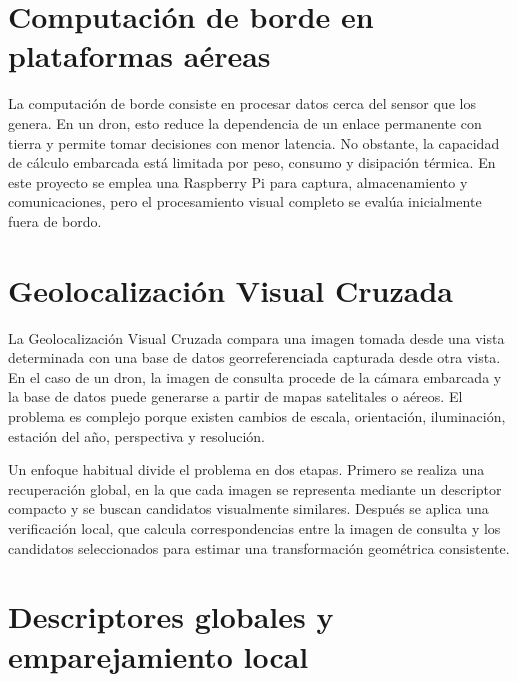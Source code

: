 \section{Computación de borde en plataformas aéreas}
\label{sec:estado-edge}

La computación de borde consiste en procesar datos cerca del sensor que los genera. En un dron, esto reduce la dependencia de un enlace permanente con tierra y permite tomar decisiones con menor latencia. No obstante, la capacidad de cálculo embarcada está limitada por peso, consumo y disipación térmica. En este proyecto se emplea una Raspberry Pi para captura, almacenamiento y comunicaciones, pero el procesamiento visual completo se evalúa inicialmente fuera de bordo.

\section{Geolocalización Visual Cruzada}
\label{sec:estado-cvgl}

La Geolocalización Visual Cruzada compara una imagen tomada desde una vista determinada con una base de datos georreferenciada capturada desde otra vista. En el caso de un dron, la imagen de consulta procede de la cámara embarcada y la base de datos puede generarse a partir de mapas satelitales o aéreos. El problema es complejo porque existen cambios de escala, orientación, iluminación, estación del año, perspectiva y resolución.

Un enfoque habitual divide el problema en dos etapas. Primero se realiza una recuperación global, en la que cada imagen se representa mediante un descriptor compacto y se buscan candidatos visualmente similares. Después se aplica una verificación local, que calcula correspondencias entre la imagen de consulta y los candidatos seleccionados para estimar una transformación geométrica consistente.

\section{Descriptores globales y emparejamiento local}
\label{sec:estado-descriptores-matching}

